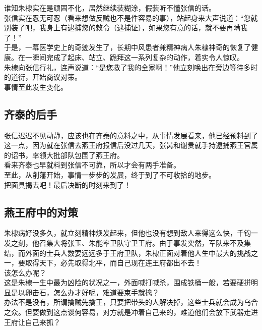 \begin{multicols}{\theparacolNo}
谁知朱棣实在是顽固不化，居然继续装糊涂，假装听不懂张信的话。\\

张信实在忍无可忍（看来想做反贼也不是件容易的事），站起身来大声说道：“您就别装了吧，我身上有逮捕您的敕令（逮捕证），如果您有意的话，就不要再瞒我了！”\\

于是，一幕医学史上的奇迹发生了，长期中风患者兼精神病人朱棣神奇的恢复了健康。在一瞬间完成了起床、站立、跪拜这一系列复杂的动作，着实令人惊叹。\\

朱棣向张信行礼，连声说道：“是您救了我的全家啊！”他立刻唤出在旁边等待多时的道衍，开始商议对策。\\

事情至此发生变化。\\

\subsection{齐泰的后手}
张信迟迟不见动静，应该也在齐泰的意料之中，从事情发展看来，他已经预料到了这一点，因为就在张信去燕王府报信后没过几天，张昺和谢贵就手持逮捕燕王官属的诏书，率领大批部队包围了燕王府。\\

看来齐泰也早就料到张信不可靠，所以才会有两手准备。\\

至此，从削藩开始，事情一步步的发展，终于到了不可收拾的地步。\\

把面具揭去吧！最后决断的时刻来到了！\\

\subsection{燕王府中的对策}
朱棣病好没多久，就立刻精神焕发起来，但他也没有想到敌人来得这么快，千钧一发之刻，他召集大将张玉、朱能率卫队守卫王府。由于事发突然，军队来不及集结，而外面的士兵人数要远远多于王府卫队，朱棣正面对着他人生中最大的挑战之一，要取得天下，必先取得北平，而自己现在连王府都出不去！\\

该怎么办呢？\\

这是朱棣一生中最为凶险的状况之一，外面喊打喊杀，围成铁桶一般，若要硬拼明显是以卵击石，怎么办才好呢，难道要束手就擒？\\

办法不是没有，所谓擒贼先擒王，只要把带头的人解决掉，这些士兵就会成为乌合之众。但要做到这点谈何容易，对方就是冲着自己来的，难道他们会放下武器走进王府让自己来抓？\\


\end{multicols}
